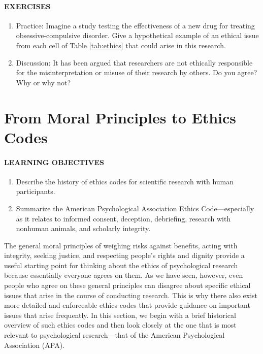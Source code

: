 \documentclass[
]{krantz}
\providecommand{\tightlist}{%
  \setlength{\itemsep}{0pt}\setlength{\parskip}{0pt}}
\begin{document}
\paragraph*{EXERCISES}\label{exercises-18}

\begin{enumerate}
\def\labelenumi{\arabic{enumi}.}
\tightlist
\item
  Practice: Imagine a study testing the effectiveness of a new drug for treating obsessive-compulsive disorder. Give a hypothetical example of an ethical issue from each cell of Table \ref{tab:ethics} that could arise in this research.
\item
  Discussion: It has been argued that researchers are not ethically responsible for the misinterpretation or misuse of their research by others. Do you agree? Why or why not?
\end{enumerate}

\section{From Moral Principles to Ethics Codes}\label{from-moral-principles-to-ethics-codes}

\paragraph*{LEARNING OBJECTIVES}\label{learning-objectives-23}

\begin{enumerate}
\def\labelenumi{\arabic{enumi}.}
\tightlist
\item
  Describe the history of ethics codes for scientific research with human participants.
\item
  Summarize the American Psychological Association Ethics Code---especially as it relates to informed consent, deception, debriefing, research with nonhuman animals, and scholarly integrity.
\end{enumerate}

The general moral principles of weighing risks against benefits, acting with integrity, seeking justice, and respecting people's rights and dignity provide a useful starting point for thinking about the ethics of psychological research because essentially everyone agrees on them. As we have seen, however, even people who agree on these general principles can disagree about specific ethical issues that arise in the course of conducting research. This is why there also exist more detailed and enforceable ethics codes that provide guidance on important issues that arise frequently. In this section, we begin with a brief historical overview of such ethics codes and then look closely at the one that is most relevant to psychological research---that of the American Psychological Association (APA).
\end{document}

